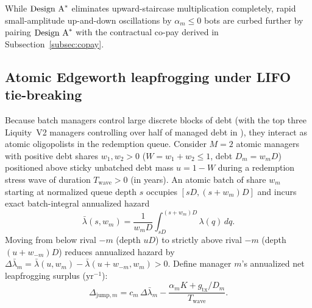 While $\textup{Design A}^*$ eliminates upward-staircase multiplication completely, rapid small-amplitude up-and-down oscillations by $\alpha_m \le 0$ bots are curbed further by pairing $\textup{Design A}^*$ with the contractual co-pay derived in Subsection~\ref{subsec:copay}.

\subsection{Atomic Edgeworth leapfrogging under LIFO tie-breaking}\label{subsec:leapfrog}

Because batch managers control large discrete blocks of debt (with the top three Liquity~V2 managers controlling over half of managed debt in \citealp{companion2026}), they interact as atomic oligopolists in the redemption queue. Consider $M = 2$ atomic managers with positive debt shares $w_1, w_2 > 0$ ($W = w_1 + w_2 \le 1$, debt $D_m = w_m D$) positioned above sticky unbatched debt mass $u = 1 - W$ during a redemption stress wave of duration $T_{\mathrm{wave}} > 0$ (in years). An atomic batch of share $w_m$ starting at normalized queue depth $s$ occupies $[s D, (s + w_m)D]$ and incurs exact batch-integral annualized hazard
\[
\bar{\lambda}(s, w_m) = \frac{1}{w_m D}\int_{s D}^{(s + w_m)D} \lambda(q)\,dq.
\]
Moving from below rival $-m$ (depth $u D$) to strictly above rival $-m$ (depth $(u + w_{-m})D$) reduces annualized hazard by $\Delta\bar{\lambda}_m = \bar{\lambda}(u, w_m) - \bar{\lambda}(u + w_{-m}, w_m) > 0$. Define manager $m$'s annualized net leapfrogging surplus ($\mathrm{yr}^{-1}$):
\begin{equation}\label{eq:delta_jump}
\Delta_{\mathrm{jump}, m} = c_m\,\Delta\bar{\lambda}_m - \frac{\alpha_m K + g_{\mathrm{tx}}/D_m}{T_{\mathrm{wave}}}.
\end{equation}

